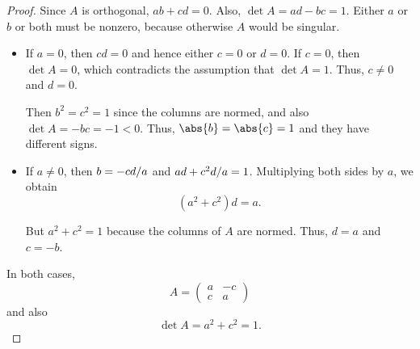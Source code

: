 \begin{proof}
  Since \( A \) is orthogonal, \( ab + cd = 0 \). Also, \( \det A = ad - bc = 1 \). Either \( a \) or \( b \) or both must be nonzero, because otherwise \( A \) would be singular.
  \begin{itemize}
    \item If \( a = 0 \), then \( cd = 0 \) and hence either \( c = 0 \) or \( d = 0 \). If \( c = 0 \), then \( \det A = 0 \), which contradicts the assumption that \( \det A = 1 \). Thus, \( c \neq 0 \) and \( d = 0 \).

    Then \( b^2 = c^2 = 1 \) since the columns are normed, and also \( \det A = -bc = -1 < 0 \). Thus, \( \abs{b} = \abs{c} = 1 \) and they have different signs.

    \item If \( a \neq 0 \), then \( b = -\ifrac {cd} a \) and \( ad + \ifrac {c^2 d} a = 1 \). Multiplying both sides by \( a \), we obtain
    \begin{equation*}
      (a^2 + c^2) d = a.
    \end{equation*}

    But \( a^2 + c^2 = 1 \) because the columns of \( A \) are normed. Thus, \( d = a \) and \( c = -b \).
  \end{itemize}

  In both cases,
  \begin{equation*}
    A
    =
    \begin{pmatrix}
      a & -c \\
      c & a
    \end{pmatrix}
  \end{equation*}
  and also
  \begin{equation*}
    \det A = a^2 + c^2 = 1.
  \end{equation*}
\end{proof}

